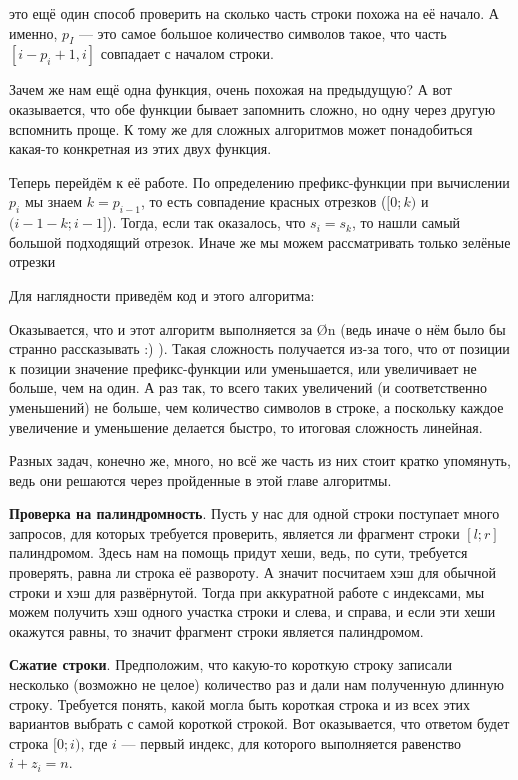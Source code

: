 это ещё один способ проверить на сколько часть строки похожа на её начало. А именно, $p_I$ — это самое большое количество символов такое, что часть $[i - p_i + 1, i]$ совпадает с началом строки.

Зачем же нам ещё одна функция, очень похожая на предыдущую? А вот оказывается, что обе функции бывает запомнить сложно, но одну через другую вспомнить проще. К тому же для сложных алгоритмов может понадобиться какая-то конкретная из этих двух функция.

\begin{wrapping}{0.5}
    Теперь перейдём к её работе. По определению префикс-функции при вычислении $p_i$ мы знаем $k=p_{i-1}$, то есть совпадение красных отрезков ($[0; k)$ и $(i - 1 - k; i - 1]$). Тогда, если так оказалось, что $s_i = s_k$, то нашли самый большой подходящий отрезок. Иначе же мы можем рассматривать только зелёные отрезки
\end{wrapping}

Для наглядности приведём код и этого алгоритма:


Оказывается, что и этот алгоритм выполняется за \O{n} (ведь иначе о нём было бы странно рассказывать :) ). Такая сложность получается из-за того, что от позиции к позиции значение префикс-функции или уменьшается, или увеличивает не больше, чем на один. А раз так, то всего таких увеличений (и соответственно уменьшений) не больше, чем количество символов в строке, а поскольку каждое увеличение и уменьшение делается быстро, то итоговая сложность линейная.


Разных задач, конечно же, много, но всё же часть из них стоит кратко упомянуть, ведь они решаются через пройденные в этой главе алгоритмы. 

\textbf{Проверка на палиндромность}. Пусть у нас для одной строки поступает много запросов, для которых требуется проверить, является ли фрагмент строки $[l; r]$ палиндромом. Здесь нам на помощь придут хеши, ведь, по сути, требуется проверять, равна ли строка её развороту. А значит посчитаем хэш для обычной строки и хэш для развёрнутой. Тогда при аккуратной работе с индексами, мы можем получить хэш одного участка строки и слева, и справа, и если эти хеши окажутся равны, то значит фрагмент строки является палиндромом.

\textbf{Сжатие строки}. Предположим, что какую-то короткую строку записали несколько (возможно не целое) количество раз и дали нам полученную длинную строку. Требуется понять, какой могла быть короткая строка и из всех этих вариантов выбрать с самой короткой строкой. Вот оказывается, что ответом будет строка $[0; i)$, где $i$ — первый индекс, для которого выполняется равенство $i + z_i = n$.

